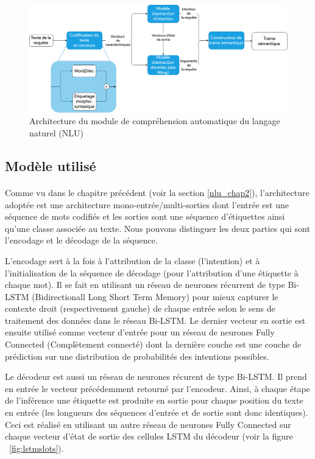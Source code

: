 	\begin{figure}[h] 
		\centering
		\includegraphics[width=0.88\linewidth]{images/Conception/NLU/nlu_module_arch.png}
		\caption{Architecture du module de compréhension automatique du langage naturel (NLU)}
		\label{nlu_arch}
		
	\end{figure}
	\subsection{Modèle utilisé}
		\paragraph{}\label{joint_model}
		Comme vu dans le chapitre précédent (voir la section \ref{nlu_chap2}), l'architecture adoptée est une architecture mono-entrée/multi-sorties dont l'entrée est une séquence de mots codifiés et les sorties sont une séquence d'étiquettes ainsi qu'une classe associée au texte. Nous pouvons distinguer les deux parties qui sont l'encodage et le décodage de la séquence. 
		\par L'encodage sert à la fois à l'attribution de la classe (l'intention) et à l'initialisation de la séquence de décodage (pour l'attribution d'une étiquette à chaque mot).
		Il se fait en utilisant un réseau de neurones récurrent de type Bi-LSTM (Bidirectionall Long Short Term Memory) pour mieux capturer le contexte droit (respectivement gauche) de chaque entrée selon le sens de traitement des données dans le réseau Bi-LSTM. Le dernier vecteur en sortie est ensuite utilisé comme vecteur d'entrée pour un réseau de neurones Fully Connected (Complètement connecté) dont la dernière couche est une couche de prédiction sur une distribution de probabilités des intentions possibles.
		\par
		Le décodeur est aussi un réseau de neurones récurent de type Bi-LSTM. Il prend en entrée le vecteur précédemment retourné par l'encodeur. Ainsi, à chaque étape de l'inférence une étiquette est produite en sortie pour chaque position du texte en entrée (les longueurs des séquences d'entrée et de sortie sont donc identiques). Ceci est réalisé en utilisant un autre réseau de neurones Fully Connected sur chaque vecteur d'état de sortie des cellules LSTM du décodeur (voir la figure ~\ref{fig:lstmslots}).
